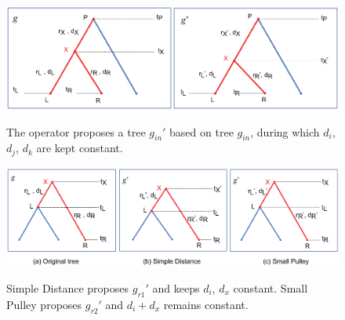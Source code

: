 \documentclass{bmcart}
\begin{document}
\begin{backmatter}
\begin{figure}[h!]
\includegraphics[width=12cm]{Fig02-internalnodes.eps}\\
\caption{
             The operator proposes a tree ${g_{in}}'$ based on tree $g_{in}$, during which $d_i$, $d_j$, $d_k$ are kept constant.}
\label{internalnodes}
\end{figure}

\begin{figure}[h!]
\includegraphics[width=12cm]{Fig03-rootstrategy.eps}\\
\caption{
             Simple Distance proposes ${g_{r1}}'$ and keeps $d_i$, $d_x$ constant. Small Pulley proposes ${g_{r2}}'$ and ${d_i} + {d_x}$ remains constant.}
\label{simpledistance}
\end{figure}



\end{backmatter}
\end{document}
